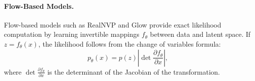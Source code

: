 \paragraph{Flow-Based Models.}
Flow-based models such as RealNVP \citep{dinh2016density} and Glow \citep{kingma2018glow} provide exact likelihood computation by learning invertible mappings $f_\theta$ between data and latent space. If $z = f_\theta(x)$, the likelihood follows from the change of variables formula:
\begin{equation}
p_\theta(x) = p(z) \left| \det \frac{\partial f_\theta}{\partial x} \right|,
\end{equation}
where $\det \frac{\partial f_\theta}{\partial x}$ is the determinant of the Jacobian of the transformation.